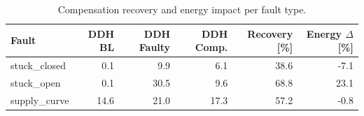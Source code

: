 \begin{table}[htbp]
  \centering
  \caption{Compensation recovery and energy impact per fault type.}
  \label{tab:comp_recovery}
  \begin{tabular}{lrrrrr}
    \toprule
    Fault & DDH BL & DDH Faulty & DDH Comp. & Recovery [\%] & Energy $\Delta$ [\%] \\
    \midrule
    stuck\_closed & 0.1 & 9.9 & 6.1 & 38.6 & -7.1 \\
    stuck\_open & 0.1 & 30.5 & 9.6 & 68.8 & 23.1 \\
    supply\_curve & 14.6 & 21.0 & 17.3 & 57.2 & -0.8 \\
    \bottomrule
  \end{tabular}
\end{table}